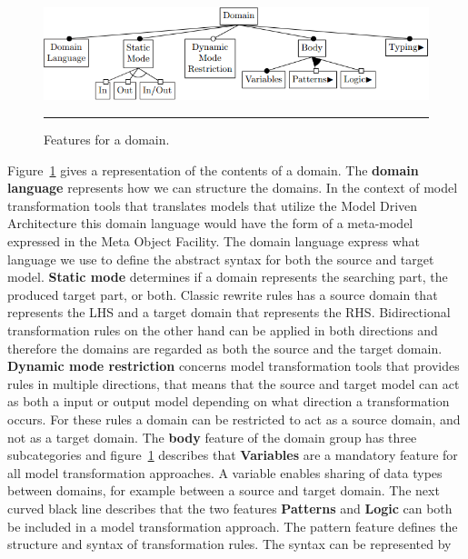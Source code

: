 \begin{figure}[H]
  \centering
    \includegraphics[scale=0.65]{./Figures/Domain_1.png}
    \rule{35em}{0.5pt}
  \caption[Feature diagram a domain]
  {Features for a domain.}
  \label{fig:Domain}
\end{figure}


Figure~\ref{fig:Domain} gives a representation of the contents of a domain.
The \textbf{domain language} represents how we can structure the domains. In the
context of model transformation tools that translates models that utilize the Model
Driven Architecture this domain language would have the form of a meta-model
expressed in the Meta Object Facility. The domain language express what language we use to
define the abstract syntax for both the source and target model. \textbf{Static
mode} determines if a domain represents the searching part, the produced target
part, or both. Classic rewrite rules has a source domain that represents the
LHS and a target domain that represents the RHS. Bidirectional transformation
rules on the other hand can be applied in both directions and therefore the 
domains are regarded as both the source and the target domain.
\textbf{Dynamic mode restriction} concerns model transformation tools that provides rules in
multiple directions, that means that the source and target model can act as
both a input or output model depending on what direction a transformation
occurs. For these rules a domain can be restricted to act as a source domain,
and not as a target domain. The \textbf{body} feature of the domain group has
three subcategories and figure~\ref{fig:Domain} describes that
\textbf{Variables} are a mandatory feature for all model transformation
approaches. A variable enables sharing of data types between domains, for
example between a source and target domain. The next curved black line describes
that the two features \textbf{Patterns} and \textbf{Logic} can both be included
in a model transformation approach. The pattern feature defines the
structure and syntax of transformation rules. The syntax can be represented by
